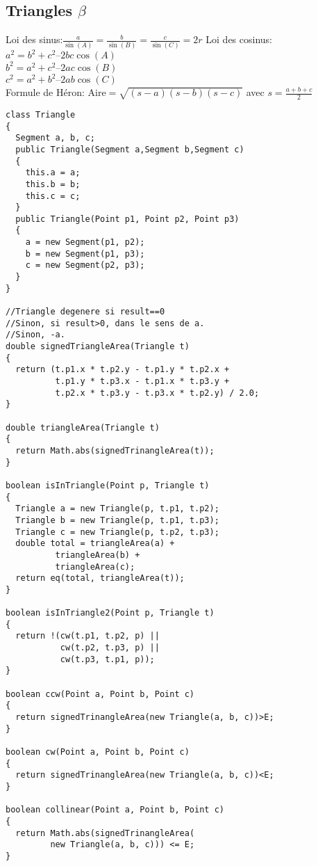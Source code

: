 \subsection[Triangles]{Triangles $\beta$}
Loi des sinus:$\frac{a}{\sin(A)}=\frac{b}{\sin(B)}=\frac{c}{\sin(C)}=2r$
Loi des cosinus:\\
$a^2 = b^2 + c^2 – 2bc\cos(A)$\\
$b^2 = a^2 + c^2 – 2ac\cos(B)$\\
$c^2 = a^2 + b^2 – 2ab\cos(C)$\\
Formule de Héron: Aire$=\sqrt{(s-a)(s-b)(s-c)}$ avec $s=\frac{a+b+c}{2}$
\begin{lstlisting}
class Triangle
{
  Segment a, b, c;
  public Triangle(Segment a,Segment b,Segment c)
  {
    this.a = a;
    this.b = b;
    this.c = c;
  }
  public Triangle(Point p1, Point p2, Point p3)
  {
    a = new Segment(p1, p2);
    b = new Segment(p1, p3);
    c = new Segment(p2, p3);
  }
}

//Triangle degenere si result==0
//Sinon, si result>0, dans le sens de a.
//Sinon, -a.
double signedTriangleArea(Triangle t)
{
  return (t.p1.x * t.p2.y - t.p1.y * t.p2.x +
          t.p1.y * t.p3.x - t.p1.x * t.p3.y +
          t.p2.x * t.p3.y - t.p3.x * t.p2.y) / 2.0;
}
	
double triangleArea(Triangle t)
{
  return Math.abs(signedTrinangleArea(t));
}

boolean isInTriangle(Point p, Triangle t)
{
  Triangle a = new Triangle(p, t.p1, t.p2);
  Triangle b = new Triangle(p, t.p1, t.p3);
  Triangle c = new Triangle(p, t.p2, t.p3);
  double total = triangleArea(a) +
		  triangleArea(b) +
		  triangleArea(c);
  return eq(total, triangleArea(t));
}

boolean isInTriangle2(Point p, Triangle t)
{
  return !(cw(t.p1, t.p2, p) ||
           cw(t.p2, t.p3, p) ||
           cw(t.p3, t.p1, p));
}

boolean ccw(Point a, Point b, Point c)
{
  return signedTrinangleArea(new Triangle(a, b, c))>E;
}

boolean cw(Point a, Point b, Point c)
{
  return signedTrinangleArea(new Triangle(a, b, c))<E;
}

boolean collinear(Point a, Point b, Point c)
{
  return Math.abs(signedTrinangleArea(
         new Triangle(a, b, c))) <= E;
}
\end{lstlisting}
